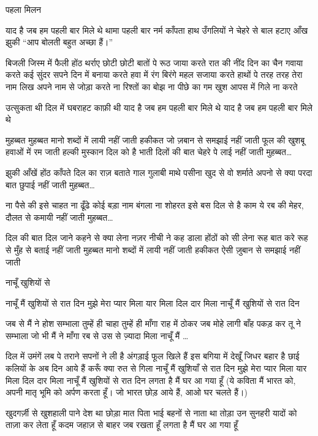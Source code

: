 पहला मिलन

याद है जब हम पहली बार मिले थे
थामा पहली बार नर्म काँपता हाथ
उँगलियों ने चेहरे से बाल हटाए
आँख झुकी “आप बोलती बहुत
अच्छा हैं।”




बिजली जिस्म में फैली होंठ थर्राए
छोटी छोटी बातों पे रूठ जाया करते
रात की नींद दिन का चैन गवाया करते
कई सुंदर सपने दिन में बनाया करते
हवा में रंग बिरंगे महल सजाया करते
हाथों पे तरह तरह तेरा नाम लिख
अपने नाम से जोड़ा करते
ना रिश्तों का बोझ ना पीछे का गम
खुश आपस में गिले ना करते

उत्सुकता थी दिल में घबराहट काफ़ी थी
याद है जब हम पहली बार मिले थे
याद है जब हम पहली बार मिले थे

मुहब्बत
मुहब्बत मानो शब्दों में लायी नहीं जाती
हकीकत जो ज़बान से समझाई नहीं जाती
फूल की खुशबू हवाओं में रम जाती
हल्की मुस्कान दिल को है भाती
दिलों की बात चेहरे पे लाई नहीं जाती
मुहब्बत…



झुकी आँखें होंठ काँपते दिल का राज़ बताते
गाल गुलाबी माथे पसीना खुद से वो शर्माते
अपनो से क्या परदा बात छुपाई नहीं जाती
मुहब्बत…

ना पैसे की इसे चाहत ना ढूँढे कोई बड़ा नाम
बंगला ना शोहरत इसे बस दिल से है काम
ये रब की मेहर, दौलत से कमायी नहीं जाती
मुहब्बत…

दिल की बात दिल जाने कहने से क्या लेना
नज़र नीची ने कह डाला होंठों को सी लेना
रूह बात करे रूह से मुँह से बताई नहीं जाती 
मुहब्बत मानो शब्दों में लायी नहीं जाती
हकीकत ऐसी ज़ुबान से समझाई नहीं जाती



नाचूँ खुशियों से

नाचूँ मैं खुशियों से रात दिन
मुझे मेरा प्यार मिला
यार मिला दिल दार मिला
नाचूँ मैं खुशियों से रात दिन

जब से मैं ने होश सम्भाला
तुम्हें ही चाहा तुम्हें ही माँगा
राह में ठोकर जब मोहे लागी
बाँह पकड़ कर तू ने सम्भाला
जो भी मैं ने माँगा रब से
उस से ज़्यादा मिला
नाचूँ मैं …

दिल में उमंगें लब पे तराने
सपनों ने ली है अंगड़ाई
फूल खिले हैं इस बगिया में
देखूँ जिधर बहार है छाई
कलियों के अब दिन आये हैं
करूँ क्या रुत से गिला
नाचूँ मैं खुशियाँ से रात दिन
मुझे मेरा प्यार मिला
यार मिला दिल दार मिला
नाचूँ मैं खुशियों से रात दिन
लगता है मैं घर आ गया हूँ 
(ये कविता मैं भारत को, अपनी मातृ भूमि को
अर्पण करता हूँ। जो भारत छोड़ आये हैं,
आओ घर चलते हैं।)


खुदगर्ज़ी से खुशहाली पाने देश था छोड़ा
मात पिता भाई बहनों से नाता था तोड़ा
उन सुनहरी यादों को ताज़ा कर लेता हूँ
कदम जहाज़ से बाहर जब रखता हूँ
लगता है मैं घर आ गया हूँ

